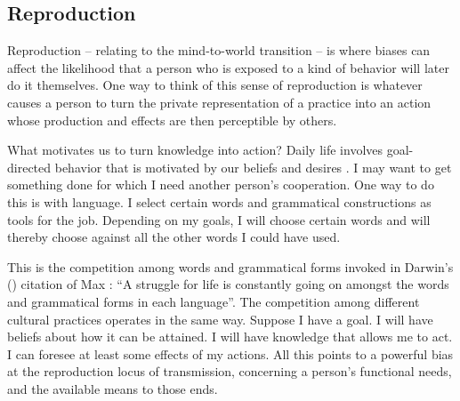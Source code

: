 \subsection{Reproduction}
Reproduction -- relating to the mind-to-world transition -- is where biases can affect the likelihood that a person who is exposed to a kind of behavior will later do it themselves. One way to think of this sense of reproduction is whatever causes a 
person to turn the private representation of a practice into an action 
whose production and effects are then perceptible by others.



What motivates us to turn knowledge into action? Daily life involves 
goal-directed behavior that is motivated by our beliefs and desires  
\citep{davidson_essential_2006,searle_intentionality:_1983,fodor_psychosemantics_1987}. I may want to get 
something done for which I need another person's cooperation. One way to do this is with language. I select certain words and 
grammatical constructions as tools for the job. Depending on my goals, I will choose
certain words and will thereby choose against all the other words I 
could have used. 



This is the competition among words and grammatical forms invoked in 
Darwin's (\citeyear[60]{darwin_descent_1871}) citation of Max \citet{muller_darwinism_1870}: ``A struggle for 
life is constantly going on amongst the words and grammatical forms in 
each language''. The competition among different cultural practices 
operates in the same way. Suppose I have a goal. I will have beliefs about 
how it can be attained. I will have knowledge that allows me to act. I can foresee at least some effects of my actions. All this 
points to a powerful bias at the reproduction locus of transmission, concerning a person's functional needs, and the available means to those ends. 



